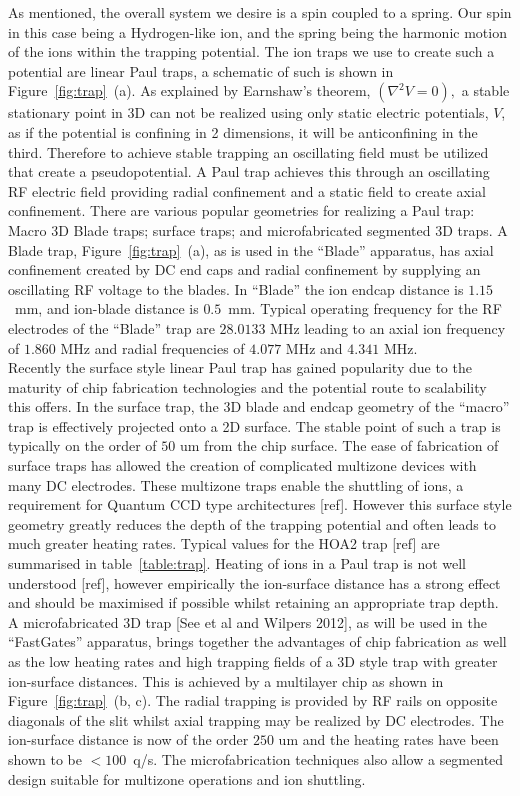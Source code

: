 \documentclass[12pt]{iopart}
\begin{document}
As mentioned, the overall system we desire is a spin coupled to a
spring. Our spin in this case being a Hydrogen-like ion, and the
spring being the harmonic motion of the ions within the trapping
potential. The ion traps we use to create such a potential are linear
Paul traps, a schematic of such is shown in
Figure~\ref{fig:trap}~(a). As explained by Earnshaw's theorem,
$(\nabla^2 V = 0),$
a stable stationary point in 3D can not be realized using only static
electric potentials, $V$, as if the potential is confining in 2
dimensions, it will be anticonfining in the third. Therefore to
achieve stable trapping an oscillating field must be utilized that create a pseudopotential.
A Paul trap achieves this through an oscillating RF electric field
providing radial confinement and a static field to create axial
confinement. There are various popular geometries for realizing a Paul
trap: Macro 3D Blade traps; surface traps; and microfabricated
segmented 3D traps.  A Blade trap, Figure~\ref{fig:trap}~(a), as is used in the ``Blade''
apparatus, has axial confinement created by DC end caps and radial
confinement by supplying an oscillating RF voltage to the blades. In
``Blade'' the ion endcap distance is $1.15$~mm, and ion-blade distance
is $0.5$~mm. Typical operating frequency for the RF electrodes of the
``Blade'' trap are $28.0133$ MHz leading to an axial ion frequency of
$1.860$ MHz and radial frequencies of $4.077$ MHz and $4.341$ MHz.\\
Recently the surface style linear Paul trap has gained popularity due
to the maturity of chip fabrication technologies and the potential
route to scalability this offers. In the surface trap, the 3D blade
and endcap geometry of the ``macro'' trap is effectively projected
onto a 2D surface. The stable point of such a trap is typically on the
order of $50$ um from the chip surface. The ease of fabrication of
surface traps has allowed the creation of complicated multizone
devices with many DC electrodes.  These multizone traps enable the
shuttling of ions, a requirement for Quantum CCD type architectures
[ref]. However this surface style geometry greatly reduces the depth
of the trapping potential and often leads to much greater heating
rates. Typical values for the HOA2 trap [ref] are summarised in
table~\ref{table:trap}. Heating of ions in a Paul trap is not well
understood [ref], however empirically the ion-surface distance has a
strong effect and should be maximised if possible whilst retaining an
appropriate trap depth.\\
A microfabricated 3D trap [See et al and Wilpers 2012], as will be
used in the ``FastGates'' apparatus, brings together the advantages of
chip fabrication as well as the low heating rates and high trapping
fields of a 3D style trap with greater ion-surface distances. This is
achieved by a multilayer chip as shown in Figure~\ref{fig:trap}~(b,
c). The radial trapping is provided by RF rails on opposite diagonals
of the slit whilst axial trapping may be realized by DC
electrodes. The ion-surface distance is now of the order $250$ um and
the heating rates have been shown to be $< 100$~q/s. The
microfabrication techniques also allow a segmented design suitable for
multizone operations and ion shuttling.
\end{document}
